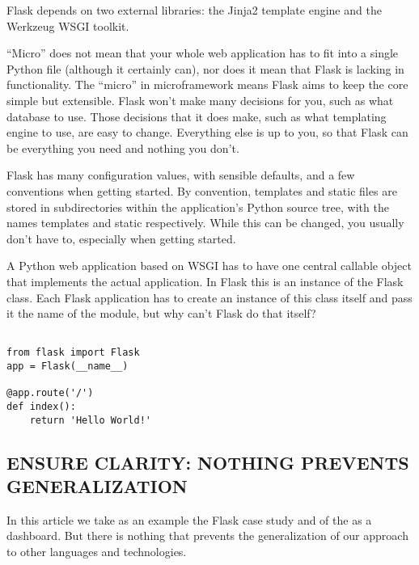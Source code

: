  Flask depends on two external libraries: the Jinja2 template engine and the Werkzeug WSGI toolkit. 

 “Micro” does not mean that your whole web application has to fit into a single Python file (although it certainly can), nor does it mean that Flask is lacking in functionality. The “micro” in microframework means Flask aims to keep the core simple but extensible. Flask won’t make many decisions for you, such as what database to use. Those decisions that it does make, such as what templating engine to use, are easy to change. Everything else is up to you, so that Flask can be everything you need and nothing you don’t.

 Flask has many configuration values, with sensible defaults, and a few conventions when getting started. By convention, templates and static files are stored in subdirectories within the application’s Python source tree, with the names templates and static respectively. While this can be changed, you usually don’t have to, especially when getting started.

 A Python web application based on WSGI has to have one central callable object that implements the actual application. In Flask this is an instance of the Flask class. Each Flask application has to create an instance of this class itself and pass it the name of the module, but why can’t Flask do that itself?

\begin{lstlisting}[style=custompython]

from flask import Flask
app = Flask(__name__)

@app.route('/')
def index():
    return 'Hello World!'

\end{lstlisting}


\subsection*{ENSURE CLARITY: NOTHING PREVENTS GENERALIZATION}
In this article we take as an example the Flask case study
and of the \tool as a dashboard. 
But there is nothing that prevents the generalization of 
our approach to other languages and technologies. 


